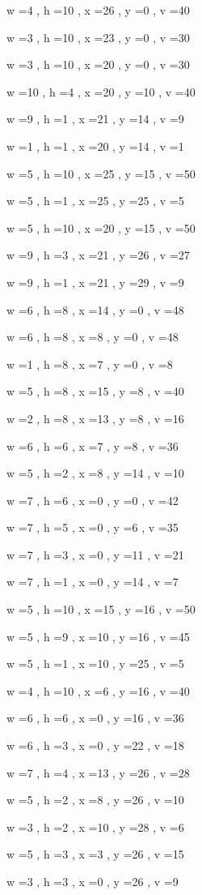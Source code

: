 \documentclass[11pt]{article}
\begin{document}
w =4 , h =10 , x =26 , y =0 , v =40
\par
w =3 , h =10 , x =23 , y =0 , v =30
\par
w =3 , h =10 , x =20 , y =0 , v =30
\par
w =10 , h =4 , x =20 , y =10 , v =40
\par
w =9 , h =1 , x =21 , y =14 , v =9
\par
w =1 , h =1 , x =20 , y =14 , v =1
\par
w =5 , h =10 , x =25 , y =15 , v =50
\par
w =5 , h =1 , x =25 , y =25 , v =5
\par
w =5 , h =10 , x =20 , y =15 , v =50
\par
w =9 , h =3 , x =21 , y =26 , v =27
\par
w =9 , h =1 , x =21 , y =29 , v =9
\par
w =6 , h =8 , x =14 , y =0 , v =48
\par
w =6 , h =8 , x =8 , y =0 , v =48
\par
w =1 , h =8 , x =7 , y =0 , v =8
\par
w =5 , h =8 , x =15 , y =8 , v =40
\par
w =2 , h =8 , x =13 , y =8 , v =16
\par
w =6 , h =6 , x =7 , y =8 , v =36
\par
w =5 , h =2 , x =8 , y =14 , v =10
\par
w =7 , h =6 , x =0 , y =0 , v =42
\par
w =7 , h =5 , x =0 , y =6 , v =35
\par
w =7 , h =3 , x =0 , y =11 , v =21
\par
w =7 , h =1 , x =0 , y =14 , v =7
\par
w =5 , h =10 , x =15 , y =16 , v =50
\par
w =5 , h =9 , x =10 , y =16 , v =45
\par
w =5 , h =1 , x =10 , y =25 , v =5
\par
w =4 , h =10 , x =6 , y =16 , v =40
\par
w =6 , h =6 , x =0 , y =16 , v =36
\par
w =6 , h =3 , x =0 , y =22 , v =18
\par
w =7 , h =4 , x =13 , y =26 , v =28
\par
w =5 , h =2 , x =8 , y =26 , v =10
\par
w =3 , h =2 , x =10 , y =28 , v =6
\par
w =5 , h =3 , x =3 , y =26 , v =15
\par
w =3 , h =3 , x =0 , y =26 , v =9
\par
\newpage
\end{document}
